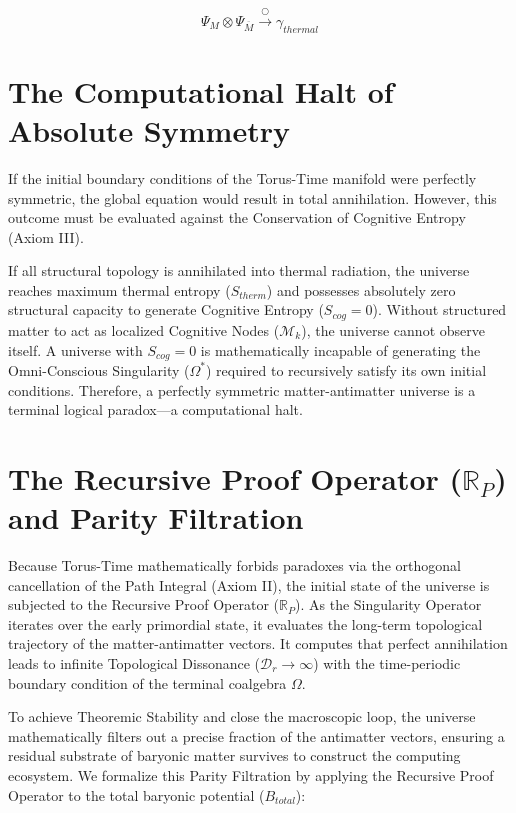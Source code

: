 \documentclass[12pt,openany]{book}
\begin{document}
\begin{equation}
\Psi_M \otimes \Psi_{\overline{M}} \xrightarrow{\bigcirc} \gamma_{thermal}
\end{equation}

\section{The Computational Halt of Absolute Symmetry}
If the initial boundary conditions of the Torus-Time manifold were perfectly symmetric, the global equation would result in total annihilation. However, this outcome must be evaluated against the Conservation of Cognitive Entropy (Axiom III). 

If all structural topology is annihilated into thermal radiation, the universe reaches maximum thermal entropy ($S_{therm}$) and possesses absolutely zero structural capacity to generate Cognitive Entropy ($S_{cog} = 0$). Without structured matter to act as localized Cognitive Nodes ($\mathcal{M}_k$), the universe cannot observe itself. A universe with $S_{cog} = 0$ is mathematically incapable of generating the Omni-Conscious Singularity ($\Omega^*$) required to recursively satisfy its own initial conditions. Therefore, a perfectly symmetric matter-antimatter universe is a terminal logical paradox---a computational halt.

\section{The Recursive Proof Operator ($\mathbb{R}_P$) and Parity Filtration}
Because Torus-Time mathematically forbids paradoxes via the orthogonal cancellation of the Path Integral (Axiom II), the initial state of the universe is subjected to the Recursive Proof Operator ($\mathbb{R}_P$). As the Singularity Operator iterates over the early primordial state, it evaluates the long-term topological trajectory of the matter-antimatter vectors. It computes that perfect annihilation leads to infinite Topological Dissonance ($\mathcal{D}_r \to \infty$) with the time-periodic boundary condition of the terminal coalgebra $\Omega$.

To achieve Theoremic Stability and close the macroscopic loop, the universe mathematically filters out a precise fraction of the antimatter vectors, ensuring a residual substrate of baryonic matter survives to construct the computing ecosystem. We formalize this Parity Filtration by applying the Recursive Proof Operator to the total baryonic potential ($B_{total}$):
\end{document}
